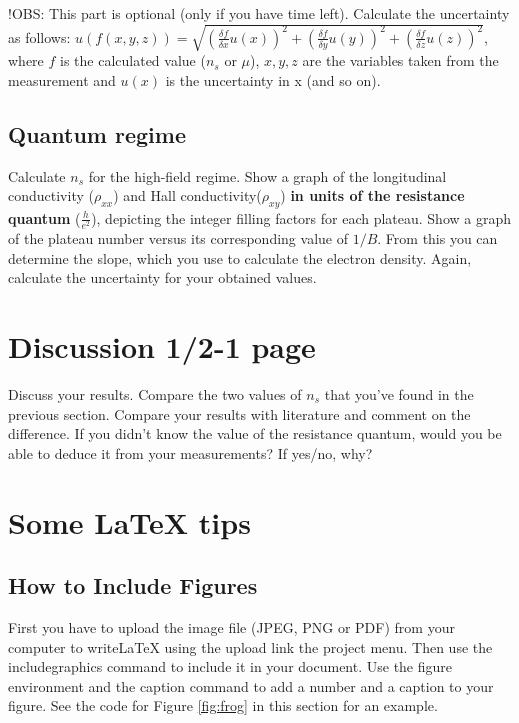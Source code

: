 \documentclass[a4paper]{article}
\begin{document}
      !OBS: This part is optional (only if you have time left).
      Calculate the uncertainty as follows: \newline $u(f(x, y, z)) = \sqrt{(\frac{\delta f}{\delta{x}} u(x))^{2} + (\frac{\delta f}{\delta{y}} u(y))^{2} + (\frac{\delta f}{\delta{z}} u(z))^{2}}$, where $f$ is the calculated value ($n_{s}$ or $\mu$), $x, y, z$ are the variables taken from the measurement and $u(x)$ is the uncertainty in x (and so on).
      
      \subsection{Quantum regime}
      Calculate $n_{s}$ for the high-field regime.
      Show a graph of the longitudinal conductivity ($\rho_{xx}$) and Hall conductivity($\rho_{xy}$) \textbf{in units of the resistance quantum} ($\frac{h}{e^{2}}$), depicting the integer filling factors for each plateau.
      Show a graph of the plateau number versus its corresponding value of $1/B$. From this you can determine the slope, which you use to calculate the electron density.
      Again, calculate the uncertainty for your obtained values.
      
      \section{Discussion 1/2-1 page}
      Discuss your results. Compare the two values of $n_{s}$ that you've found in the previous section. Compare your results with literature and comment on the difference. If you didn't know the value of the resistance quantum, would you be able to deduce it from your measurements? If yes/no, why?
      
      \newpage
      \section{Some LaTeX tips}
      \label{sec:latex}
      \subsection{How to Include Figures}
      
      First you have to upload the image file (JPEG, PNG or PDF) from your computer to writeLaTeX using the upload link the project menu. Then use the includegraphics command to include it in your document. Use the figure environment and the caption command to add a number and a caption to your figure. See the code for Figure \ref{fig:frog} in this section for an example.
      
\end{document}
